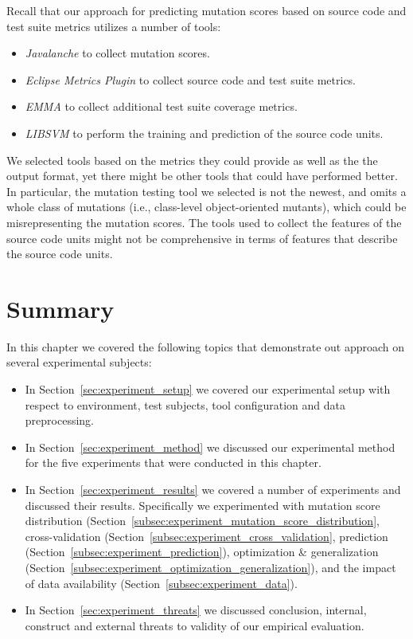 Recall that our approach for predicting mutation scores based on source code and test suite metrics utilizes a number of tools:

\begin{itemize}
  \item \emph{Javalanche} to collect mutation scores.
  \item \emph{Eclipse Metrics Plugin} to collect source code and test suite metrics.
  \item \emph{EMMA} to collect additional test suite coverage metrics.
  \item \emph{LIBSVM} to perform the training and prediction of the source code units.
\end{itemize}

We selected tools based on the metrics they could provide as well as the the output format, yet there might be other tools that could have performed better. In particular, the mutation testing tool we selected is not the newest, and omits a whole class of mutations (i.e., class-level object-oriented mutants), which could be misrepresenting the mutation scores. The tools used to collect the features of the source code units might not be comprehensive in terms of features that describe the source code units.


\section{Summary}
\label{sec:experiment_summary}
In this chapter we covered the following topics that demonstrate out approach on several experimental subjects:

\begin{itemize}
  \item In Section~\ref{sec:experiment_setup} we covered our experimental setup with respect to environment, test subjects, tool configuration and data preprocessing.
  \item In Section~\ref{sec:experiment_method} we discussed our experimental method for the five experiments that were conducted in this chapter.
  \item In Section~\ref{sec:experiment_results} we covered a number of experiments and discussed their results. Specifically we experimented with mutation score distribution (Section~\ref{subsec:experiment_mutation_score_distribution}, cross-validation (Section~\ref{subsec:experiment_cross_validation}, prediction (Section~\ref{subsec:experiment_prediction}), optimization \& generalization (Section~\ref{subsec:experiment_optimization_generalization}), and the impact of data availability (Section~\ref{subsec:experiment_data}).
  \item In Section~\ref{sec:experiment_threats} we discussed conclusion, internal, construct and external threats to validity of our empirical evaluation.
\end{itemize}
